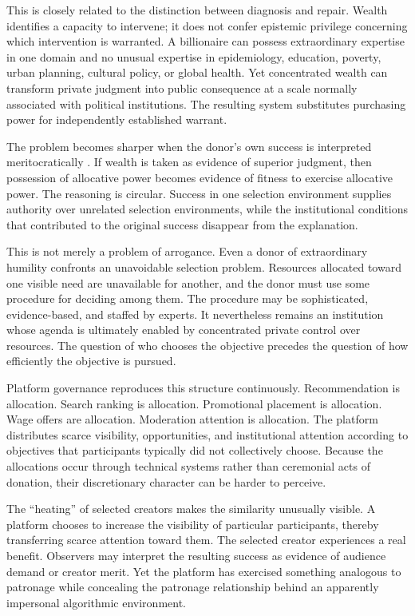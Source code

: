 \documentclass[11pt]{article}
\begin{document}
This is closely related to the distinction between diagnosis and repair. Wealth identifies a capacity to intervene; it does not confer epistemic privilege concerning which intervention is warranted. A billionaire can possess extraordinary expertise in one domain and no unusual expertise in epidemiology, education, poverty, urban planning, cultural policy, or global health. Yet concentrated wealth can transform private judgment into public consequence at a scale normally associated with political institutions. The resulting system substitutes purchasing power for independently established warrant.

The problem becomes sharper when the donor's own success is interpreted meritocratically \citep{sandel2020tyranny,frank2016success,merton1968matthew}. If wealth is taken as evidence of superior judgment, then possession of allocative power becomes evidence of fitness to exercise allocative power. The reasoning is circular. Success in one selection environment supplies authority over unrelated selection environments, while the institutional conditions that contributed to the original success disappear from the explanation.

This is not merely a problem of arrogance. Even a donor of extraordinary humility confronts an unavoidable selection problem. Resources allocated toward one visible need are unavailable for another, and the donor must use some procedure for deciding among them. The procedure may be sophisticated, evidence-based, and staffed by experts. It nevertheless remains an institution whose agenda is ultimately enabled by concentrated private control over resources. The question of who chooses the objective precedes the question of how efficiently the objective is pursued.

Platform governance reproduces this structure continuously. Recommendation is allocation. Search ranking is allocation. Promotional placement is allocation. Wage offers are allocation. Moderation attention is allocation. The platform distributes scarce visibility, opportunities, and institutional attention according to objectives that participants typically did not collectively choose. Because the allocations occur through technical systems rather than ceremonial acts of donation, their discretionary character can be harder to perceive.

The ``heating'' of selected creators makes the similarity unusually visible. A platform chooses to increase the visibility of particular participants, thereby transferring scarce attention toward them. The selected creator experiences a real benefit. Observers may interpret the resulting success as evidence of audience demand or creator merit. Yet the platform has exercised something analogous to patronage while concealing the patronage relationship behind an apparently impersonal algorithmic environment.
\end{document}
